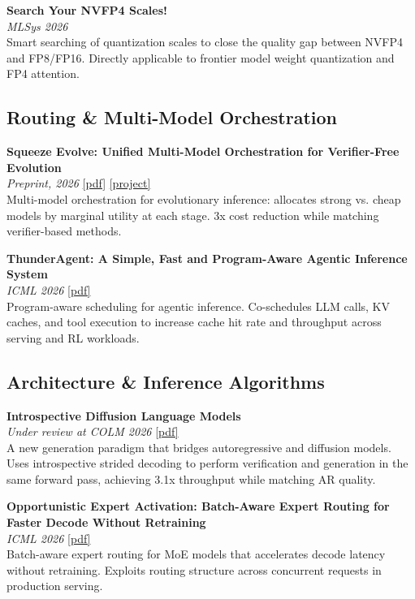 \documentclass[11pt,letterpaper]{article}
\begin{document}
\vspace{6pt}
\noindent\textbf{Search Your NVFP4 Scales!}\\
\textit{MLSys 2026}\\[2pt]
Smart searching of quantization scales to close the quality gap between NVFP4 and FP8/FP16. Directly applicable to frontier model weight quantization and FP4 attention.

\subsection*{Routing \& Multi-Model Orchestration}
\noindent\textbf{Squeeze Evolve: Unified Multi-Model Orchestration for Verifier-Free Evolution}\\
\textit{Preprint, 2026} \href{https://arxiv.org/abs/2604.07725}{[pdf]} \href{https://squeeze-evolve.github.io/}{[project]}\\[2pt]
Multi-model orchestration for evolutionary inference: allocates strong vs. cheap models by marginal utility at each stage. 3x cost reduction while matching verifier-based methods.

\vspace{6pt}
\noindent\textbf{ThunderAgent: A Simple, Fast and Program-Aware Agentic Inference System}\\
\textit{ICML 2026} \href{https://arxiv.org/abs/2602.13692}{[pdf]}\\[2pt]
Program-aware scheduling for agentic inference. Co-schedules LLM calls, KV caches, and tool execution to increase cache hit rate and throughput across serving and RL workloads.

\subsection*{Architecture \& Inference Algorithms}
\noindent\textbf{Introspective Diffusion Language Models}\\
\textit{Under review at COLM 2026} \href{https://arxiv.org/abs/2604.11035}{[pdf]}\\[2pt]
A new generation paradigm that bridges autoregressive and diffusion models. Uses introspective strided decoding to perform verification and generation in the same forward pass, achieving 3.1x throughput while matching AR quality.

\vspace{6pt}
\noindent\textbf{Opportunistic Expert Activation: Batch-Aware Expert Routing for Faster Decode Without Retraining}\\
\textit{ICML 2026} \href{https://arxiv.org/abs/2511.02237}{[pdf]}\\[2pt]
Batch-aware expert routing for MoE models that accelerates decode latency without retraining. Exploits routing structure across concurrent requests in production serving.
\end{document}

